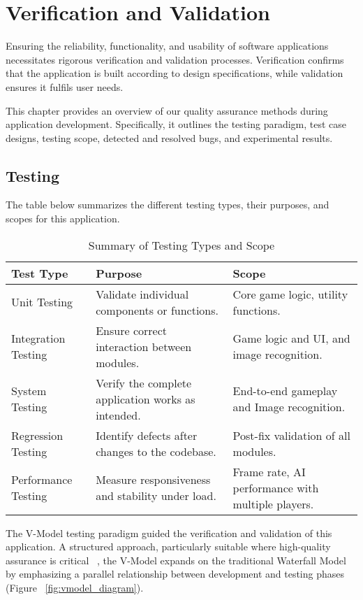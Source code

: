 \chapter{Verification and Validation}
\label{chap:verification-and-validation}

Ensuring the reliability, functionality, and usability of software applications necessitates rigorous verification and validation processes. Verification confirms that the application is built according to design specifications, while validation ensures it fulfils user needs.

This chapter provides an overview of our quality assurance methods during application development. Specifically, it outlines the testing paradigm, test case designs, testing scope, detected and resolved bugs, and experimental results.

\section{Testing}
The table below summarizes the different testing types, their purposes, and scopes for this application.

\begin{table}[ht!]
    \centering
    \begin{tabular}{|p{4cm}|p{4cm}|p{4cm}|}
    \hline
    \textbf{Test Type} & \textbf{Purpose} & \textbf{Scope} \\ \hline
    Unit Testing       & Validate individual components or functions. & Core game logic, utility functions. \\ \hline
    Integration Testing & Ensure correct interaction between modules. & Game logic and UI, and image recognition. \\ 
    \hline
    System Testing     & Verify the complete application works as intended. & End-to-end gameplay and Image recognition. \\ \hline
    Regression Testing & Identify defects after changes to the codebase. & Post-fix validation of all modules. \\ \hline
    Performance Testing & Measure responsiveness and stability under load. & Frame rate, AI performance with multiple players. \\ \hline
    \end{tabular}
    \caption{Summary of Testing Types and Scope}
    \label{tab:testing_summary}
\end{table}

The V-Model testing paradigm guided the verification and validation of this application. A structured approach, particularly suitable where high-quality assurance is critical ~\cite{bib:vmodel}, the V-Model expands on the traditional Waterfall Model by emphasizing a parallel relationship between development and testing phases (Figure ~\ref{fig:vmodel_diagram}). 

